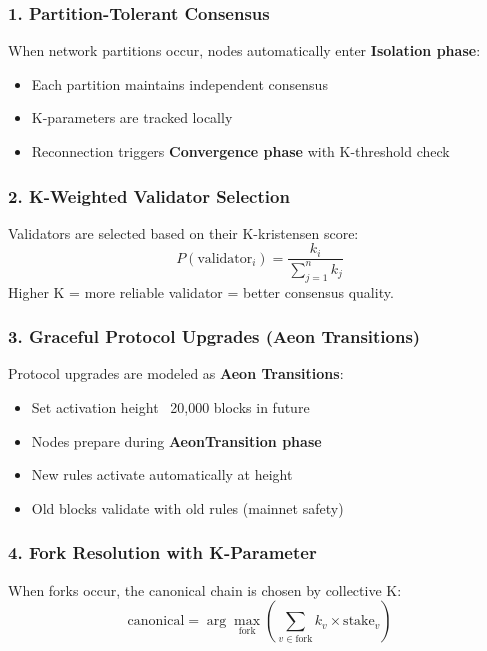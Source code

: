 \documentclass[12pt,a4paper]{article}
\begin{document}
\subsubsection{1. Partition-Tolerant Consensus}
When network partitions occur, nodes automatically enter \textbf{Isolation phase}:
\begin{itemize}
    \item Each partition maintains independent consensus
    \item K-parameters are tracked locally
    \item Reconnection triggers \textbf{Convergence phase} with K-threshold check
\end{itemize}

\subsubsection{2. K-Weighted Validator Selection}
Validators are selected based on their K-kristensen score:
\begin{equation}
P(\text{validator}_i) = \frac{k_i}{\sum_{j=1}^{n} k_j}
\end{equation}
Higher K = more reliable validator = better consensus quality.

\subsubsection{3. Graceful Protocol Upgrades (Aeon Transitions)}
Protocol upgrades are modeled as \textbf{Aeon Transitions}:
\begin{itemize}
    \item Set activation height ~20,000 blocks in future
    \item Nodes prepare during \textbf{AeonTransition phase}
    \item New rules activate automatically at height
    \item Old blocks validate with old rules (mainnet safety)
\end{itemize}

\subsubsection{4. Fork Resolution with K-Parameter}
When forks occur, the canonical chain is chosen by collective K:
\begin{equation}
\text{canonical} = \arg\max_{\text{fork}} \left( \sum_{v \in \text{fork}} k_v \times \text{stake}_v \right)
\end{equation}
\end{document}

